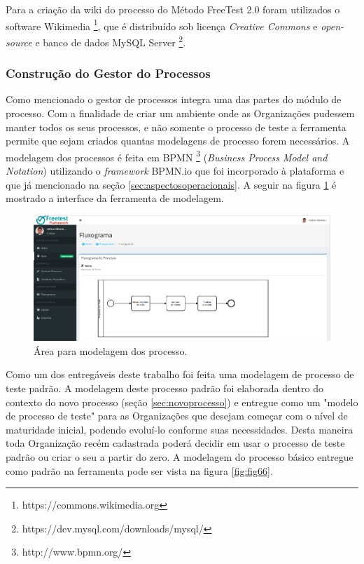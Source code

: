 Para a criação da wiki do processo do Método FreeTest 2.0 foram utilizados o software Wikimedia \footnote{https://commons.wikimedia.org}, que é distribuído sob licença \textit{Creative Commons} e \textit{open-source} e banco de dados MySQL Server \footnote{https://dev.mysql.com/downloads/mysql/}.

\subsubsection{Construção do Gestor do Processos} 
\label{sec:gestordeprocessos}

Como mencionado o gestor de processos integra uma das partes do módulo de processo. Com a finalidade de criar um ambiente onde as Organizações pudessem manter todos os seus processos, e não somente o processo de teste a ferramenta permite que sejam criados quantas modelagens de processo forem necessários. A modelagem dos processos é feita em BPMN \footnote{http://www.bpmn.org/} (\textit{Business Process Model and Notation}) utilizando o \textit{framework} BPMN.io que foi incorporado à plataforma e que já mencionado na seção \ref{sec:aspectosoperacionais}. A seguir na figura \ref{fig:fig65} é mostrado a interface da ferramenta de modelagem.

\begin{figure}[H]
\centering
\includegraphics[width=.90\textwidth]{fig/figura65.png}
\caption{Área para modelagem dos processo.}
\label{fig:fig65}
\end{figure}

Como um dos entregáveis deste trabalho foi feita uma modelagem de processo de teste padrão. A modelagem deste processo padrão foi elaborada dentro do contexto do novo processo (seção \ref{sec:novoprocesso}) e entregue como um "modelo de processo de teste" para as Organizações que desejam começar com o nível de maturidade inicial, podendo evoluí-lo conforme suas necessidades. Desta maneira toda Organização recém cadastrada poderá decidir em usar o processo de teste padrão ou criar o seu a partir do zero. A modelagem do processo básico entregue como padrão na ferramenta pode ser vista na figura \ref{fig:fig66}.

